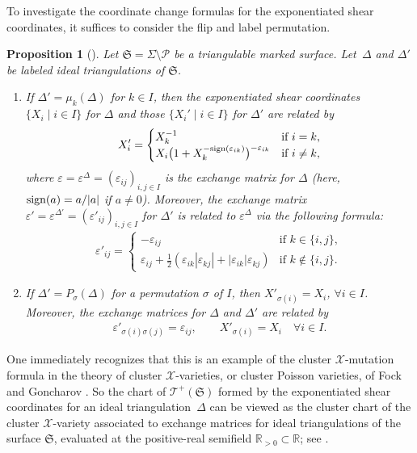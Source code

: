 \documentclass[pdftex]{sigma}
\numberwithin{equation}{section}
\newtheorem{Proposition}[Theorem]{Proposition}
\theoremstyle{definition}
\begin{document}
To investigate the coordinate change formulas for the exponentiated shear coordinates, it suffices to consider the flip and label permutation.
\begin{Proposition}[\cite{AB, BL07, F97, FST, Liu}]
\label{prop:shear_coordinate_change}
Let $\mathfrak{S} = \Sigma\setminus \mathcal{P}$ be a triangulable marked surface. Let~$\Delta$ and $\Delta'$ be labeled ideal triangulations of $\mathfrak{S}$.
\begin{enumerate}[label={\rm (\arabic*)}]\itemsep=0pt
\item If $\Delta' = \mu_k(\Delta)$ for $k\in I$, then the exponentiated shear coordinates $\{X_i \mid i \in I\}$ for $\Delta$ and those $\{X_i'\mid i \in I\}$ for $\Delta'$ are related by
\[
X'_i =\begin{cases}
 X_k^{-1} & \mbox{if } i=k, \\
 X_i \bigl(1+X_k^{-{\rm sign}(\varepsilon_{ik})}\bigr)^{-\varepsilon_{ik}} & \mbox{if } i\neq k,
 \end{cases}
\]
where $\varepsilon = \varepsilon^\Delta=(\varepsilon_{ij})_{i,j\in I}$ is the exchange matrix for $\Delta$ (here, ${\rm sign}(a)=a/|a|$ if $a\neq 0$). Moreover, the exchange matrix $\varepsilon' = \varepsilon^{\Delta'}=(\varepsilon'_{ij})_{i,j\in I}$ for $\Delta'$ is related to $\varepsilon^\Delta$ via the following formula:
\begin{align*}
\varepsilon'_{ij}
= \begin{cases}
 -\varepsilon_{ij} & \mbox{if } k\in \{i,j\}, \\
 \varepsilon_{ij} + \frac{1}{2}(\varepsilon_{ik}|\varepsilon_{kj}| + |\varepsilon_{ik}|\varepsilon_{kj}) & \mbox{if } k\notin \{i,j\}.
 \end{cases}
\end{align*}
\item If $\Delta' = P_\sigma(\Delta)$ for a permutation $\sigma$ of $I$, then $X'_{\sigma(i)} = X_i$, $\forall i\in I$. Moreover, the exchange matrices for $\Delta$ and $\Delta'$ are related by
\begin{align*}
\varepsilon'_{\sigma(i) \sigma(j)} = \varepsilon_{ij}, \qquad
X'_{\sigma(i)} = X_i \quad \forall i \in I.
\end{align*}
\end{enumerate}
\end{Proposition}
One immediately recognizes that this is an example of the cluster $\mathscr{X}$-mutation formula in the theory of cluster $\mathscr{X}$-varieties, or cluster Poisson varieties, of Fock and Goncharov \cite{FG06, FG06b, FG09}. So the chart of $\mathscr{T}^+(\mathfrak{S})$ formed by the exponentiated shear coordinates for an ideal triangulation~$\Delta$ can be viewed as the cluster chart of the cluster $\mathscr{X}$-variety associated to exchange matrices for ideal triangulations of the surface $\mathfrak{S}$, evaluated at the positive-real semifield $\mathbb{R}_{>0} \subset \mathbb{R}$; see \cite{FG06}.
\end{document}
